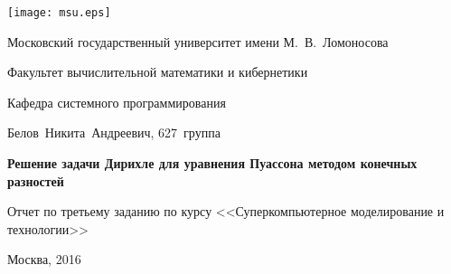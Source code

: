 \thispagestyle{empty}

\begin{center}
  \texttt{[image: msu.eps]}\par
  Московский государственный университет имени М.~В.~Ломоносова\par
  Факультет вычислительной математики и кибернетики\par
  Кафедра системного программирования\par

  \vspace{3cm}

  {\large
    Белов~Никита~Андреевич, 627~группа
  }\par

  \vspace{1cm}

  \textbf{
    {\Large
      Решение задачи Дирихле для уравнения Пуассона методом конечных разностей
    }
  }\par
\end{center}

\vspace{1cm}

\begin{center}
  Отчет по третьему заданию по курсу <<Суперкомпьютерное моделирование и технологии>>\par
\end{center}

\vspace{7cm}

\begin{center}
  Москва, 2016
\end{center}

\clearpage
